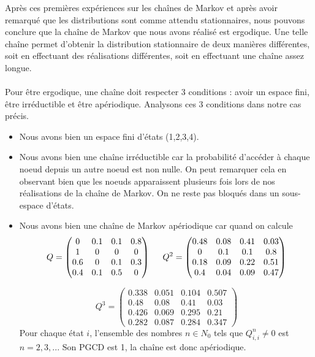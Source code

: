 \subsubsection{}
\label{section:1.1.4}
Après ces premières expériences sur les chaînes de Markov et après avoir remarqué que les distributions sont comme attendu stationnaires, nous pouvons conclure que la chaîne de Markov que nous avons réalisé est ergodique.
Une telle chaîne permet d'obtenir la distribution stationnaire de deux manières différentes, soit en effectuant des réalisations différentes, soit en effectuant une chaîne assez longue.
\\\\
Pour être ergodique, une chaîne doit respecter 3 conditions : avoir un espace fini, être irréductible et être apériodique. Analysons ces 3 conditions dans notre cas précis.

\begin{itemize}
  \item Nous avons bien un espace fini d'états (1,2,3,4).
  \item Nous avons bien une chaîne irréductible car la probabilité d'accéder à chaque noeud depuis un autre noeud est non nulle. On peut remarquer cela en observant bien que les noeuds apparaissent plusieurs fois lors de nos réalisations de la chaîne de Markov. On ne reste pas bloqués dans un sous-espace d'états.
  \item Nous avons bien une chaîne de Markov apériodique car quand on calcule 
  \begin{equation*}
    Q = \begin{pmatrix}
      0 & 0.1 & 0.1 & 0.8\\
      1 & 0 & 0 & 0\\
      0.6 & 0 & 0.1 & 0.3\\
      0.4 & 0.1 & 0.5 & 0
    \end{pmatrix}
    \hspace{0.5cm}
    Q^2 = \begin{pmatrix}
      0.48 & 0.08 & 0.41 & 0.03\\
      0 & 0.1 & 0.1 & 0.8\\
      0.18 & 0.09 & 0.22 & 0.51\\
      0.4 & 0.04 & 0.09 & 0.47
    \end{pmatrix}
  \end{equation*}

  \begin{equation*}
    Q^3 = \begin{pmatrix}
      0.338 & 0.051 & 0.104 & 0.507\\
      0.48 & 0.08 & 0.41 & 0.03\\
      0.426 & 0.069 & 0.295 & 0.21\\
      0.282 & 0.087 & 0.284 & 0.347
    \end{pmatrix}
\end{equation*}
Pour chaque état $i$, l'ensemble des nombres $n \in N_0$ tels que $Q_{i,i}^n \neq 0$ est $n = {2,3,...}$ Son PGCD est 1, la chaîne est donc apériodique.
\end{itemize}